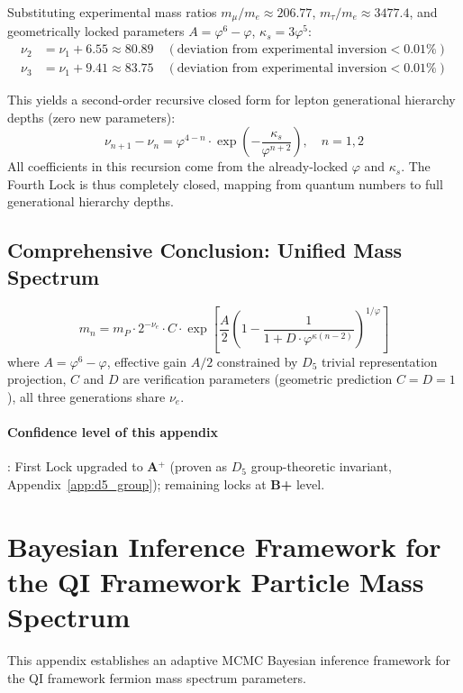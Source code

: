 \documentclass[12pt,a4paper,twocolumn]{article}
\renewcommand{\phi}{\varphi}
\begin{document}
Substituting experimental mass ratios $m_\mu/m_e \approx 206.77$, $m_\tau/m_e \approx 3477.4$, and geometrically locked parameters $A=\phi^6-\phi$, $\kappa_s=3\phi^5$:
\begin{align}
\nu_2 &= \nu_1 + 6.55 \approx 80.89 \quad (\text{deviation from experimental inversion} < 0.01\%) \\
\nu_3 &= \nu_1 + 9.41 \approx 83.75 \quad (\text{deviation from experimental inversion} < 0.01\%)
\end{align}

This yields a second-order recursive closed form for lepton generational hierarchy depths (zero new parameters):
\begin{equation}
\nu_{n+1} - \nu_n = \phi^{4-n} \cdot \exp\left(-\frac{\kappa_s}{\phi^{n+2}}\right), \quad n=1,2
\label{eq:nu_recursive}
\end{equation}
All coefficients in this recursion come from the already-locked $\phi$ and $\kappa_s$. The Fourth Lock is thus completely closed, mapping from quantum numbers to full generational hierarchy depths.

\subsection{Comprehensive Conclusion: Unified Mass Spectrum}
\[
\boxed{
m_n = m_P \cdot 2^{-\nu_e} \cdot C \cdot \exp\left[\frac{A}{2}\left(1-\frac{1}{1+D\cdot\phi^{\kappa(n-2)}}\right)^{1/\phi}\right]
}
\]
where $A=\phi^6-\phi$, effective gain $A/2$ constrained by $D_5$ trivial representation projection, $C$ and $D$ are verification parameters (geometric prediction $C=D=1$), all three generations share $\nu_e$.

\paragraph{Confidence level of this appendix}: First Lock upgraded to \textbf{A$^+$} (proven as $D_5$ group-theoretic invariant, Appendix~\ref{app:d5_group}); remaining locks at \textbf{B+} level.

\section{Bayesian Inference Framework for the QI Framework Particle Mass Spectrum}
\label{app:bayesian}

This appendix establishes an adaptive MCMC Bayesian inference framework for the QI framework fermion mass spectrum parameters.
\end{document}
